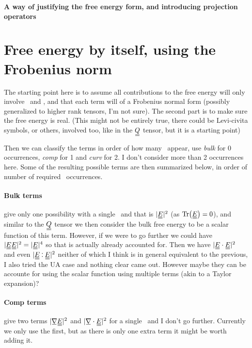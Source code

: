 \documentclass[11pt]{article}
\begin{document}
\begin{center}
    \LARGE
    \textbf{A way of justifying the free energy form, and introducing projection operators}
\end{center}
\vspace{1em}

\section{Free energy by itself, using the Frobenius norm}
The starting point here is to assume all contributions to the free energy will only involve \EE\ and \mgrad, and that each term will of a Frobenius normal form (possibly generalized to higher rank tensors, I'm not sure).
The second part is to make sure the free energy is real.
(This might not be entirely true, there could be Levi-civita symbols, or others, involved too, like in the $\du{Q}$ tensor, but it is a starting point)

Then we can classify the terms in order of how many \mgrad\ appear, use \emph{bulk} for 0 occurrences, \emph{comp} for 1 and \emph{curv} for 2.
I don't consider more than 2 occurrences here.
Some of the resulting possible terms are then summarized below, in order of number of required \EE\ occurrences.

\paragraph{Bulk terms} give only one possibility with a single \EE\ and that is $|\du{E}|^2$ (as $\Tr(\du{E}) = 0$), and similar to the $\du{Q}$ tensor we then consider the bulk free energy to be a scalar function of this term.
However, if we were to go further we could have $|\du{E}\du{E}|^2 = |\du{E}|^4$ so that is actually already accounted for. Then we have $|\du{E} \cdot \du{E}|^2$ and even $|\du{E} \cddot \du{E}|^2$ neither of which I think is in general equivalent to the previous, I also tried the UA case and nothing clear came out.
However maybe they can be accounte for using the scalar function using multiple terms (akin to a Taylor expansion)?

\paragraph{Comp terms} give two terms $|\su{\nabla} \du{E}|^2$ and $|\su{\nabla} \cdot \du{E}|^2$ for a single \EE\ and I don't go further.
Currently we only use the first, but as there is only one extra term it might be worth adding it.
\end{document}
